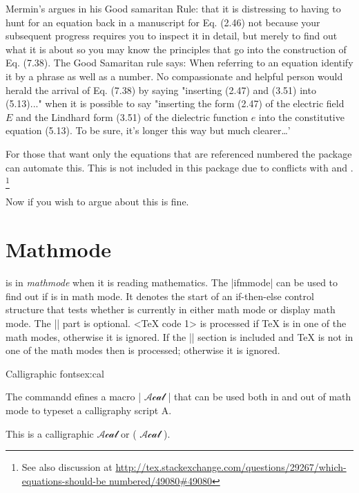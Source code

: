 {{{{Mermin's argues in his Good samaritan Rule: that it is distressing to having to hunt for an equation back in a manuscript for Eq. (2.46) not because your subsequent progress requires
you to inspect it in detail, but merely to find out what it is about so
you may know the principles that go into the construction of Eq. (7.38).
The Good Samaritan rule says: When referring to an equation identify it by
a phrase as well as a number. No compassionate and helpful person
would herald the arrival of Eq. (7.38) by saying "inserting (2.47) and (3.51)
into (5.13)..." when it is possible to say "inserting the form (2.47) of the
electric field $E$ and the Lindhard form (3.51) of the dielectric function $e$ into
the constitutive equation (5.13). To be sure, it's longer this way but much 
clearer\ldots'

For those that want only the equations that are referenced numbered the package  can automate this. This is not included in this package due to conflicts with  and .
\footnote{See also discussion at \protect\url{http://tex.stackexchange.com/questions/29267/which-equations-should-be numbered/49080\#49080}}

Now if you wish to argue about this is fine.

\section{Mathmode}

\tex is in \textit{mathmode} when it is reading mathematics. The |ifmmode| can be used to find out if \tex is in math mode. It denotes the start of an if-then-else control structure that tests whether \tex is currently in either math mode or display math mode. The |\else| part is optional. <TeX code 1> is processed if TeX is in one of the math modes, otherwise it is ignored. 
If the |\else| section is included and TeX is not in one of the math modes then  is processed; otherwise it is ignored.


\begin{texexample}{Calligraphic fonts}{ex:cal}

\newcommand{\Acal}{\ifmmode \mathcal{Acal} \else \(\) \fi}
The commandd efines a macro |\Acal| that can be used both in and out of math mode to typeset a calligraphy script A. 

This is a calligraphic {\Acal} or ({\Acal}).
\end{texexample}


}}}}
